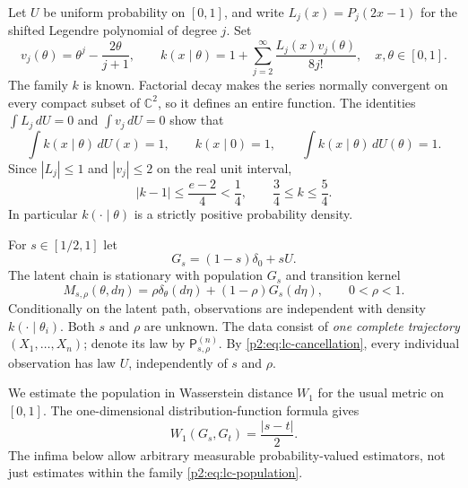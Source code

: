 \documentclass[11pt,a4paper]{article}
\theoremstyle{definition}
\theoremstyle{remark}
\numberwithin{equation}{section}
\begin{document}
Let $U$ be uniform probability on $[0,1]$, and write
$L_j(x)=P_j(2x-1)$ for the shifted Legendre polynomial of degree $j$.
Set
\begin{equation}\label{p2:eq:lc-kernel}
 v_j(\theta)=\theta^j-\frac{2\theta}{j+1},\qquad
 k(x\mid\theta)=1+\sum_{j=2}^{\infty}
                  \frac{L_j(x)v_j(\theta)}{8j!},
 \quad x,\theta\in[0,1].
\end{equation}
The family $k$ is known.  Factorial decay makes the series normally convergent
on every compact subset of $\mathbb C^2$, so it defines an entire function.
The identities $\int L_j\,dU=0$ and $\int v_j\,dU=0$ show that
\begin{equation}\label{p2:eq:lc-cancellation}
 \int k(x\mid\theta)\,dU(x)=1,
 \qquad k(x\mid0)=1,
 \qquad \int k(x\mid\theta)\,dU(\theta)=1.
\end{equation}
Since $|L_j|\le1$ and $|v_j|\le2$ on the real unit interval,
\begin{equation}\label{p2:eq:lc-bounds}
 |k-1|\le\frac{e-2}{4}<\frac14,
 \qquad \frac34\le k\le\frac54.
\end{equation}
In particular $k(\cdot\mid\theta)$ is a strictly positive probability density.

For $s\in[1/2,1]$ let
\begin{equation}\label{p2:eq:lc-population}
 G_s=(1-s)\delta_0+sU.
\end{equation}
The latent chain is stationary with population $G_s$ and transition kernel
\begin{equation}\label{p2:eq:lc-transition}
 M_{s,\rho}(\theta,d\eta)
   =\rho\delta_\theta(d\eta)+(1-\rho)G_s(d\eta),
 \qquad 0<\rho<1.
\end{equation}
Conditionally on the latent path, observations are independent with density
$k(\cdot\mid\theta_i)$.  Both $s$ and $\rho$ are unknown.  The data consist of
\emph{one complete trajectory} $(X_1,\ldots,X_n)$; denote its law by
$\mathsf P^{(n)}_{s,\rho}$.  By \eqref{p2:eq:lc-cancellation}, every individual
observation has law $U$, independently of $s$ and $\rho$.

We estimate the population in Wasserstein distance $W_1$ for the usual metric
on $[0,1]$.  The one-dimensional distribution-function formula gives
\begin{equation}\label{p2:eq:lc-wasserstein}
 W_1(G_s,G_t)=\frac{|s-t|}{2}.
\end{equation}
The infima below allow arbitrary measurable probability-valued estimators,
not just estimates within the family \eqref{p2:eq:lc-population}.
\end{document}
